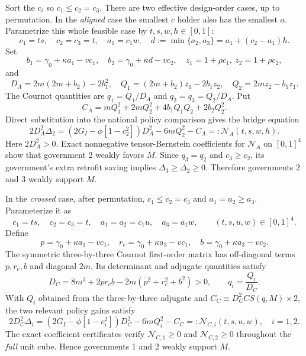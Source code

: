 Sort the \(c_i\) so \(c_1\le c_2=c_3\). There are two effective design-order cases, up to permutation. In the \emph{aligned} case the smallest \(c\) holder also has the smallest \(a\). Parametrize this whole feasible case by \(t,s,w,h\in[0,1]\):
\begin{equation}
 c_1=ts,\quad c_2=c_3=t,\quad
 a_1=c_1w,\quad
 d:=\min\{a_2,a_3\}=a_1+(c_2-a_1)h.
 \label{eq:aligned-param}
\end{equation}
Set
\[
 b_1=\gamma_0+\kappa a_1-vc_1,\quad
 b_2=\gamma_0+\kappa d-vc_2,\quad
 z_1=1+\rho c_1,\ z_2=1+\rho c_2,
\]
and
\[
 D_A=2m(2m+b_2)-2b_1^2,\quad
 Q_1=(2m+b_2)z_1-2b_1z_2,\quad
 Q_2=2mz_2-b_1z_1.
\]
The Cournot quantities are \(q_1=Q_1/D_A\) and \(q_2=q_3=Q_2/D_A\). Put
\[
 C_A=mQ_1^2+2mQ_2^2+4b_1Q_1Q_2+2b_2Q_2^2.
\]
Direct substitution into the national policy comparison gives the bridge equation
\begin{equation}
 2D_A^2\Delta_2
 =\left(2G_I-\phi[1-c_2^2]\right)D_A^2
 -6mQ_2^2-C_A
 =:\mathcal N_A(t,s,w,h).
 \label{eq:aligned-numerator}
\end{equation}
Here \(2D_A^2>0\). Exact nonnegative tensor-Bernstein coefficients for \(\mathcal N_A\) on \([0,1]^4\) show that government 2 weakly favors \(M\). Since \(q_3=q_2\) and \(c_3\ge c_2\), its government's extra retrofit saving implies \(\Delta_3\ge\Delta_2\ge0\). Therefore governments 2 and 3 weakly support \(M\).

In the \emph{crossed} case, after permutation, \(c_1\le c_2=c_3\) and \(a_1=a_2\ge a_3\). Parameterize it as
\[
 c_1=ts,\quad c_2=c_3=t,\quad
 a_1=a_2=c_1u,\quad a_3=a_1w,
 \qquad (t,s,u,w)\in[0,1]^4.
\]
Define
\[
 p=\gamma_0+\kappa a_1-vc_1,\quad
 r_c=\gamma_0+\kappa a_3-vc_1,\quad
 b=\gamma_0+\kappa a_3-vc_2.
\]
The symmetric three-by-three Cournot first-order matrix has off-diagonal terms \(p,r_c,b\) and diagonal \(2m\). Its determinant and adjugate quantities satisfy
\[
 D_C=8m^3+2p r_c b-2m(p^2+r_c^2+b^2)>0,
 \qquad q_i=\frac{Q_i}{D_C}.
\]
With \(Q_i\) obtained from the three-by-three adjugate and \(C_C\equiv D_C^2 CS(q,M)\times2\), the two relevant policy gains satisfy
\begin{equation}
 2D_C^2\Delta_i
 =\left(2G_I-\phi[1-c_i^2]\right)D_C^2
 -6mQ_i^2-C_C
 =:\mathcal N_{C,i}(t,s,u,w),\quad i=1,2.
 \label{eq:crossed-numerators}
\end{equation}
The exact coefficient certificates verify \(\mathcal N_{C,1}\ge0\) and \(\mathcal N_{C,2}\ge0\) throughout the \emph{full} unit cube. Hence governments 1 and 2 weakly support \(M\).

